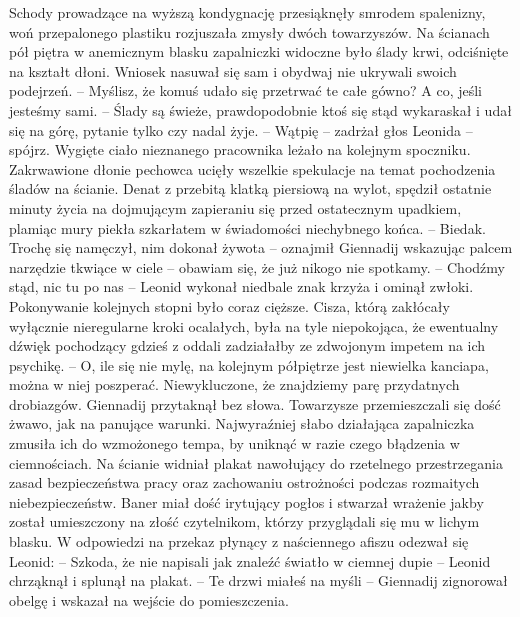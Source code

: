 \documentclass[../MAIN.tex]{subfiles}
\begin{document}
Schody prowadzące na wyższą kondygnację przesiąknęły smrodem spalenizny, woń przepalonego plastiku rozjuszała zmysły dwóch towarzyszów. Na ścianach pół piętra w anemicznym blasku zapalniczki widoczne było ślady krwi, odciśnięte na kształt dłoni. Wniosek nasuwał się sam i obydwaj nie ukrywali swoich podejrzeń. 
-- Myślisz, że komuś udało się przetrwać te całe gówno? A co, jeśli jesteśmy sami. 
-- Ślady są świeże, prawdopodobnie ktoś się stąd wykaraskał i udał się na górę, pytanie tylko czy nadal żyje. 
-- Wątpię -- zadrżał głos Leonida -- spójrz. 
Wygięte ciało nieznanego pracownika leżało na kolejnym spoczniku. Zakrwawione dłonie pechowca ucięły wszelkie spekulacje na temat pochodzenia śladów na ścianie. Denat z przebitą klatką piersiową na wylot, spędził ostatnie minuty życia na dojmującym zapieraniu się przed ostatecznym upadkiem, plamiąc mury piekła szkarłatem w świadomości niechybnego końca. 
-- Biedak. Trochę się namęczył, nim dokonał żywota -- oznajmił Giennadij wskazując palcem narzędzie tkwiące w ciele -- obawiam się, że już nikogo nie spotkamy. 
-- Chodźmy stąd, nic tu po nas -- Leonid wykonał niedbale znak krzyża i ominął zwłoki. 
Pokonywanie kolejnych stopni było coraz cięższe. Cisza, którą zakłócały wyłącznie nieregularne kroki ocalałych, była na tyle niepokojąca, że ewentualny dźwięk pochodzący gdzieś z oddali zadziałałby ze zdwojonym impetem na ich psychikę. 
-- O, ile się nie mylę, na kolejnym półpiętrze jest niewielka kanciapa, można w niej poszperać. Niewykluczone, że znajdziemy parę przydatnych drobiazgów. 
Giennadij przytaknął bez słowa. 
Towarzysze przemieszczali się dość żwawo, jak na panujące warunki. Najwyraźniej słabo działająca zapalniczka zmusiła ich do wzmożonego tempa, by uniknąć w razie czego błądzenia w ciemnościach. 
Na ścianie widniał plakat nawołujący do rzetelnego przestrzegania zasad bezpieczeństwa pracy oraz zachowaniu ostrożności podczas rozmaitych niebezpieczeństw. Baner miał dość irytujący pogłos i stwarzał wrażenie jakby został umieszczony na złość czytelnikom, którzy przyglądali się mu w lichym blasku. W odpowiedzi na przekaz płynący z naściennego afiszu odezwał się Leonid: 
-- Szkoda, że nie napisali jak znaleźć światło w ciemnej dupie -- Leonid chrząknął i splunął na plakat.
-- Te drzwi miałeś na myśli -- Giennadij zignorował obelgę i wskazał na wejście do pomieszczenia. 
\end{document}

